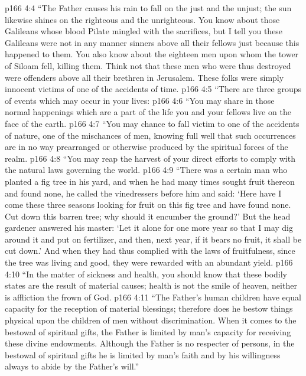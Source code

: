 \vs p166 4:4 \textcolor{ubdarkred}{“The Father causes his rain to fall on the just and the unjust; the sun likewise shines on the righteous and the unrighteous. You know about those Galileans whose blood Pilate mingled with the sacrifices, but I tell you these Galileans were not in any manner sinners above all their fellows just because this happened to them. You also know about the eighteen men upon whom the tower of Siloam fell, killing them. Think not that these men who were thus destroyed were offenders above all their brethren in Jerusalem. These folks were simply innocent victims of one of the accidents of time.}
\vs p166 4:5 \textcolor{ubdarkred}{“There are three groups of events which may occur in your lives:}
\pc \vs p166 4:6 \textcolor{ubdarkred}{“\bibnobreakspace You may share in those normal happenings which are a part of the life you and your fellows live on the face of the earth.}
\vs p166 4:7 \textcolor{ubdarkred}{“\bibnobreakspace You may chance to fall victim to one of the accidents of nature, one of the mischances of men, knowing full well that such occurrences are in no way prearranged or otherwise produced by the spiritual forces of the realm.}
\vs p166 4:8 \textcolor{ubdarkred}{“\bibnobreakspace You may reap the harvest of your direct efforts to comply with the natural laws governing the world.}
\pc \vs p166 4:9 \textcolor{ubdarkred}{“There was a certain man who planted a fig tree in his yard, and when he had many times sought fruit thereon and found none, he called the vinedressers before him and said: ‘Here have I come these three seasons looking for fruit on this fig tree and have found none. Cut down this barren tree; why should it encumber the ground?’ But the head gardener answered his master: ‘Let it alone for one more year so that I may dig around it and put on fertilizer, and then, next year, if it bears no fruit, it shall be cut down.’ And when they had thus complied with the laws of fruitfulness, since the tree was living and good, they were rewarded with an abundant yield.}
\vs p166 4:10 \textcolor{ubdarkred}{“In the matter of sickness and health, you should know that these bodily states are the result of material causes; health is not the smile of heaven, neither is affliction the frown of God.}
\vs p166 4:11 \textcolor{ubdarkred}{“The Father’s human children have equal capacity for the reception of material blessings; therefore does he bestow things physical upon the children of men without discrimination. When it comes to the bestowal of spiritual gifts, the Father is limited by man’s capacity for receiving these divine endowments. Although the Father is no respecter of persons, in the bestowal of spiritual gifts he is limited by man’s faith and by his willingness always to abide by the Father’s will.”}
